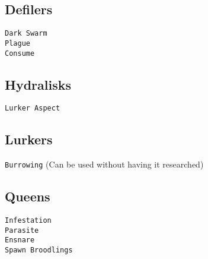 \subsection{Defilers}
\verb|Dark Swarm| \\
\verb|Plague| \\
\verb|Consume| 

\subsection{Hydralisks}
\verb|Lurker Aspect|

\subsection{Lurkers}
\verb|Burrowing| (Can be used without having it researched)

\subsection{Queens}
\verb|Infestation| \\
\verb|Parasite| \\
\verb|Ensnare| \\
\verb|Spawn Broodlings|